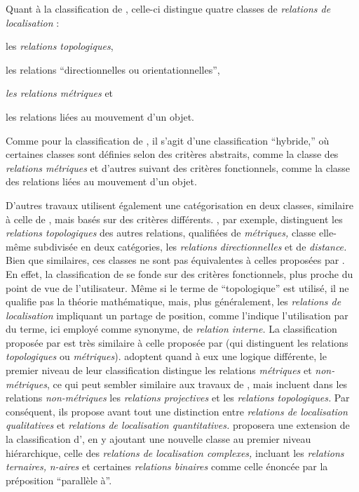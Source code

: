 Quant à la classification de \textcite{Pustejovsky2017}, celle-ci
distingue quatre classes de \emph{relations de localisation} :
%
\begin{enumerate*}[label=(\alph*)]
\item les \emph{relations topologiques},
  \item les relations \enquote{directionnelles ou
  orientationnelles},
  \item \emph{les relations métriques} et
  \item les relations liées au mouvement d'un objet.
\end{enumerate*}
%
Comme pour la classification de \textcite{Bateman2010}, il s'agit
d'une classification \enquote{hybride,} où certaines classes sont
définies selon des critères abstraits, comme la classe des
\emph{relations métriques} et d'autres suivant des critères
fonctionnels, comme la classe des relations liées au mouvement d'un
objet.

D'autres travaux \autocite{Hudelot2008a} utilisent également une
catégorisation en deux classes, similaire à celle de
\textcite{Borillo1998}, mais basés sur des critères
différents. \textcite{Hudelot2008a}, par exemple, distinguent les
\emph{relations topologiques} des autres relations, qualifiées de
\emph{métriques,} classe elle-même subdivisée en deux catégories, les
\emph{relations directionnelles} et de \emph{distance.} Bien que
similaires, ces classes ne sont pas équivalentes à celles proposées
par \textcite{Borillo1998}. En effet, la classification de
\textcite{Borillo1998} se fonde sur des critères fonctionnels, plus
proche du point de vue de l'utilisateur. Même si le terme de
\enquote{topologique} est utilisé, il ne qualifie pas la théorie
mathématique, mais, plus généralement, les \emph{relations de
  localisation} impliquant un partage de position, comme l'indique
l'utilisation par \textcite{Borillo1998} du terme, ici employé comme
synonyme, de \emph{relation interne.} La classification proposée par
\textcite{Hudelot2008a} est très similaire à celle proposée par
\textcite{Kuipers1988} (qui distinguent les relations
\emph{topologiques} ou \emph{métriques}). \textcite{Louwsma2006}
adoptent quand à eux une logique différente, le premier niveau de leur
classification distingue les relations \emph{métriques} et
\emph{non-métriques}, ce qui peut sembler similaire aux travaux de
\textcite{kuipers1988,Hudelot2008a}, mais \textcite{Louwsma2006}
incluent dans les relations \emph{non-métriques} les \emph{relations
  projectives} et les \emph{relations topologiques.} Par conséquent,
ils propose avant tout une distinction entre \emph{relations de
  localisation qualitatives} et \emph{relations de localisation
  quantitatives.} \textcite{Bloch2013} proposera une extension de la
classification d'\textcite{Hudelot2008a}, en y ajoutant une nouvelle
classe au premier niveau hiérarchique, celle des \emph{relations de
  localisation complexes,} incluant les \emph{relations ternaires,}
\emph{n-aires} et certaines \emph{relations binaires} comme celle
énoncée par la préposition \enquote{parallèle à}.

